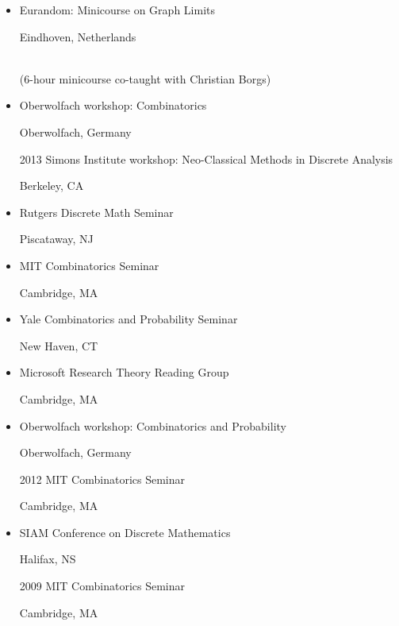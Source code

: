 \documentclass[11pt]{amsart}
\newcommand{\rightloc}[1]{\hfill {\raggedright #1}}
\begin{document}
\begin{itemize}[leftmargin=.4in,itemsep=5pt,topsep=0pt,label={}]
\item Eurandom: Minicourse on Graph Limits
  \rightloc{Eindhoven, Netherlands} \\
  \mbox{}\qquad (6-hour minicourse co-taught with Christian Borgs)

\item Oberwolfach workshop: Combinatorics
  \rightloc{Oberwolfach, Germany}

\item[2013] Simons Institute workshop: Neo-Classical Methods in
  Discrete Analysis \rightloc{Berkeley, CA}

\item Rutgers Discrete Math Seminar \rightloc{Piscataway,
    NJ}

\item MIT Combinatorics Seminar \rightloc{Cambridge, MA}

\item Yale Combinatorics and Probability Seminar
  \rightloc{New Haven, CT}

\item Microsoft Research Theory Reading Group \rightloc{Cambridge, MA}

\item Oberwolfach workshop: Combinatorics and Probability
  \rightloc{Oberwolfach, Germany}

\item[2012] MIT Combinatorics Seminar \rightloc{Cambridge, MA}   %
\item SIAM Conference on Discrete Mathematics
  \rightloc{Halifax, NS}   %
\item[2009] MIT Combinatorics Seminar \rightloc{Cambridge, MA}
\end{itemize}
\end{document}
